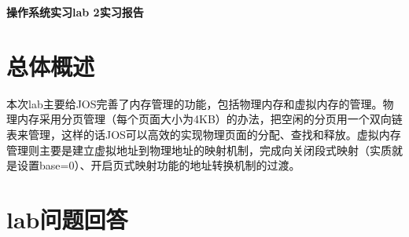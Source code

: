 \documentclass[11pt,a4paper]{article}
\begin{document}

\centerline{\Huge{\textbf{操作系统实习lab 2实习报告}}}
\tableofcontents
\thispagestyle{empty}

\section{总体概述}
本次lab主要给JOS完善了内存管理的功能，包括物理内存和虚拟内存的管理。物理内存采用分页管理（每个页面大小为4KB）的办法，把空闲的分页用一个双向链表来管理，这样的话JOS可以高效的实现物理页面的分配、查找和释放。虚拟内存管理则主要是建立虚拟地址到物理地址的映射机制，完成向关闭段式映射（实质就是设置base=0）、开启页式映射功能的地址转换机制的过渡。\\


\section{lab问题回答}
\end{document}
